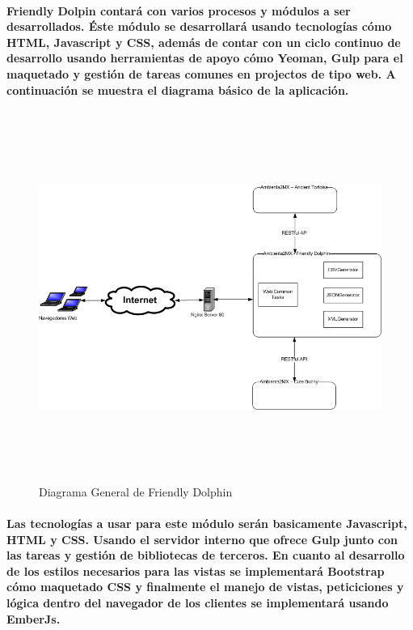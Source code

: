    \paragraph{Friendly Dolpin contará con varios procesos y módulos a ser desarrollados. Éste módulo se desarrollará usando tecnologías cómo HTML, Javascript y CSS, además de contar con un ciclo continuo de desarrollo usando herramientas de apoyo cómo Yeoman, Gulp para el maquetado y gestión de tareas comunes en projectos de tipo web. A continuación se muestra el diagrama básico de la aplicación.}
  \newpage
    \begin{landscape}
      \begin{figure}[b!]
      \centering
      \includegraphics[width=22.5cm,height=12cm]{./images/DiagramaFriendlyDolphin.png}
      \caption{Diagrama General de Friendly Dolphin}
    \end{figure}
    \end{landscape}
  \newpage
  \paragraph{Las tecnologías a usar para este módulo serán basicamente Javascript, HTML y CSS. Usando el servidor interno que ofrece Gulp junto con las tareas y gestión de bibliotecas de terceros. En cuanto al desarrollo de los estilos necesarios para las vistas se implementará Bootstrap cómo maquetado CSS y finalmente el manejo de vistas, peticiciones y lógica dentro del navegador de los clientes se implementará usando EmberJs.}
